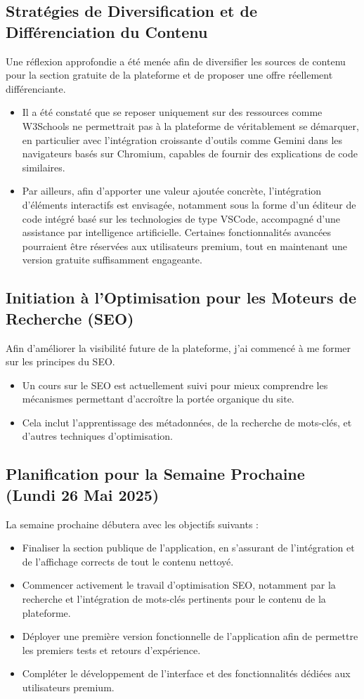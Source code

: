 \documentclass[12pt, a4paper]{article}
\begin{document}
\subsection{Stratégies de Diversification et de Différenciation du Contenu}
Une réflexion approfondie a été menée afin de diversifier les sources de contenu pour la section gratuite de la plateforme et de proposer une offre réellement différenciante.
\begin{itemize}
    \item Il a été constaté que se reposer uniquement sur des ressources comme W3Schools ne permettrait pas à la plateforme de véritablement se démarquer, en particulier avec l'intégration croissante d'outils comme Gemini dans les navigateurs basés sur Chromium, capables de fournir des explications de code similaires.
    \item Par ailleurs, afin d’apporter une valeur ajoutée concrète, l’intégration d’éléments interactifs est envisagée, notamment sous la forme d’un éditeur de code intégré basé sur les technologies de type VSCode, accompagné d’une assistance par intelligence artificielle. Certaines fonctionnalités avancées pourraient être réservées aux utilisateurs premium, tout en maintenant une version gratuite suffisamment engageante.
\end{itemize}


\subsection{Initiation à l'Optimisation pour les Moteurs de Recherche (SEO)}
Afin d'améliorer la visibilité future de la plateforme, j'ai commencé à me former sur les principes du SEO.
\begin{itemize}
    \item Un cours sur le SEO est actuellement suivi pour mieux comprendre les mécanismes permettant d'accroître la portée organique du site.
    \item Cela inclut l'apprentissage des métadonnées, de la recherche de mots-clés, et d'autres techniques d'optimisation.
\end{itemize}

\subsection{Planification pour la Semaine Prochaine (Lundi 26 Mai 2025)}
La semaine prochaine débutera avec les objectifs suivants :
\begin{itemize}
  \item Finaliser la section publique de l'application, en s'assurant de l'intégration et de l'affichage corrects de tout le contenu nettoyé.
  \item Commencer activement le travail d'optimisation SEO, notamment par la recherche et l'intégration de mots-clés pertinents pour le contenu de la plateforme.
  \item Déployer une première version fonctionnelle de l'application afin de permettre les premiers tests et retours d’expérience.
  \item Compléter le développement de l'interface et des fonctionnalités dédiées aux utilisateurs premium.
\end{itemize}
\end{document}
